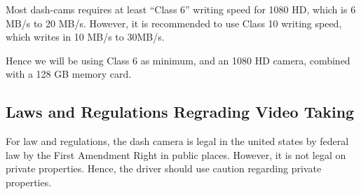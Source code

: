 \documentclass[10pt,draftclsnofoot,onecolumn,journal,compsoc]{IEEEtran}
\begin{document}
Most dash-cams requires at least “Class 6” writing speed for 1080 HD, which is 6 MB/s to 20 MB/s. However, it is recommended to use Class 10 writing speed, which writes in 10 MB/s to 30MB/s. 

Hence we will be using Class 6 as minimum, and an 1080 HD camera, combined with a 128 GB memory card.

\subsection{Laws and Regulations Regrading Video Taking} For law and regulations, the dash camera is legal in the united states by federal law by the First Amendment Right in public places. However, it is not legal on private properties. Hence, the driver should use caution regarding private properties.
\end{document}
